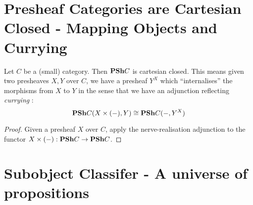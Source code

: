 \documentclass{article}
\begin{document}
\section{Presheaf Categories are Cartesian Closed - 
  Mapping Objects and Currying}

\begin{prop}

  Let $C$ be a (small) category.
  Then $\mathbf{PSh} C$ is cartesian closed. 
  This means given two presheaves $X, Y$ over $C$,
  we have a presheaf $Y^X$ which ``internalises'' 
  the morphisms from $X$ to $Y$ in the sense that we have
  an adjunction reflecting \emph{currying} : 
  \[
    \mathbf{PSh} C (X \times (-) , Y) \cong \mathbf{PSh} C ( - , Y^X)  
  \]
\end{prop}
\begin{proof}
  Given a presheaf $X$ over $ C$,
  apply the nerve-realisation adjunction to the functor
  $X \times (-) : \mathbf{PSh} C \to \mathbf{PSh} C$.
\end{proof}

\section{Subobject Classifer - A universe of propositions}
\end{document}
